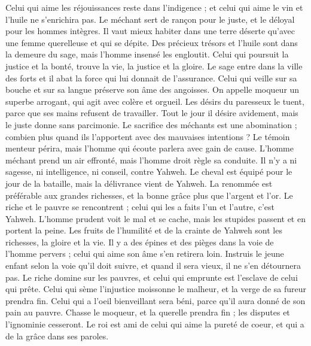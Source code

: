 \begin{multicols}{2}
Celui qui aime les réjouissances reste dans l'indigence ; et celui qui aime le vin et l'huile ne s'enrichira pas.
Le méchant sert de rançon pour le juste, et le déloyal pour les hommes intègres.
Il vaut mieux habiter dans une terre déserte qu'avec une femme querelleuse et qui se dépite.
Des précieux trésors et l'huile sont dans la demeure du sage, mais l'homme insensé les engloutit.
Celui qui poursuit la justice et la bonté, trouve la vie, la justice et la gloire.
Le sage entre dans la ville des forts et il abat la force qui lui donnait de l'assurance.
Celui qui veille sur sa bouche et sur sa langue préserve son âme des angoisses.
On appelle moqueur un superbe arrogant, qui agit avec colère et orgueil.
Les désirs du paresseux le tuent, parce que ses mains refusent de travailler.
Tout le jour il désire avidement, mais le juste donne sans parcimonie.
Le sacrifice des méchants est une abomination ; combien plus quand ils l'apportent avec des mauvaises intentions ?
Le témoin menteur périra, mais l'homme qui écoute parlera avec gain de cause.
L'homme méchant prend un air effronté, mais l'homme droit règle sa conduite.
Il n'y a ni sagesse, ni intelligence, ni conseil, contre Yahweh.
Le cheval est équipé pour le jour de la bataille, mais la délivrance vient de Yahweh.
\VerseOne{}La renommée est préférable aux grandes richesses, et la bonne grâce plus que l'argent et l'or.
Le riche et le pauvre se rencontrent ; celui qui les a faits l'un et l'autre, c'est Yahweh.
L'homme prudent voit le mal et se cache, mais les stupides passent et en portent la peine.
Les fruits de l'humilité et de la crainte de Yahweh sont les richesses, la gloire et la vie.
Il y a des épines et des pièges dans la voie de l'homme pervers ; celui qui aime son âme s'en retirera loin.
Instruis le jeune enfant selon la voie qu'il doit suivre, et quand il sera vieux, il ne s'en détournera pas.
Le riche domine sur les pauvres, et celui qui emprunte est l'esclave de celui qui prête.
Celui qui sème l'injustice moissonne le malheur, et la verge de sa fureur prendra fin.
Celui qui a l'oeil bienveillant sera béni, parce qu'il aura donné de son pain au pauvre.
Chasse le moqueur, et la querelle prendra fin ; les disputes et l'ignominie cesseront.
Le roi est ami de celui qui aime la pureté de coeur, et qui a de la grâce dans ses paroles.

\end{multicols}
